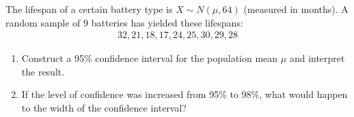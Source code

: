 \begin{exmp}\label{exmp:lifespan_ci}
    The lifespan of a certain battery type is \( X \sim N(\mu, 64) \) (measured in months).
    A random sample of 9 batteries has yielded these lifespans:
    \begin{gather*}
        32, 21, 18, 17, 24, 25, 30, 29, 28
    \end{gather*}
    \begin{enumerate}
        \item Construct a 95\% confidence interval for the population mean \( \mu \) and interpret the result.
        \item If the level of confidence was increased from 95\% to 98\%, what would happen to the width of the confidence interval?
    \end{enumerate}
\end{exmp}
